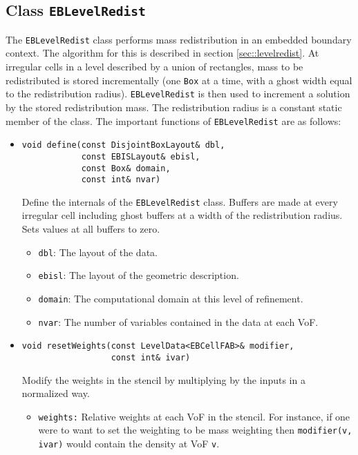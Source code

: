 \subsection{Class {\tt EBLevelRedist}}

The {\tt EBLevelRedist} class performs mass redistribution in an
embedded boundary context.  The algorithm for this is described in
section \ref{sec::levelredist}.  At irregular cells in a level
described by a  union of rectangles, mass to be redistributed is stored 
incrementally (one {\tt Box} at a time, with a ghost width equal
to the redistribution radius).   {\tt EBLevelRedist}  is then used
to increment a solution by the stored redistribution mass.
The redistribution radius is a constant static member of the class.
The important functions of {\tt EBLevelRedist} are as follows:
\begin{itemize}
\item \begin{small}\begin{verbatim}
void define(const DisjointBoxLayout& dbl,
            const EBISLayout& ebisl,
            const Box& domain,
            const int& nvar)
\end{verbatim}\end{small}
Define the internals of the {\tt EBLevelRedist} class.  Buffers
are made at every irregular cell including ghost buffers at a width
of the redistribution radius. Sets values at all buffers to zero.
\begin{itemize}
\item {\tt dbl}: The layout of the data.
\item {\tt ebisl}: The layout of the geometric description.
\item{\tt domain}: The computational domain at this level of refinement.
\item {\tt nvar}: The number of variables contained in the data
        at each VoF.
\end{itemize}

\item \begin{small}\begin{verbatim}
void resetWeights(const LevelData<EBCellFAB>& modifier,
                  const int& ivar)
\end{verbatim}\end{small}
Modify the weights in the stencil by multiplying by
the inputs in a normalized way.
\begin{itemize}
\item {\tt weights:}  Relative weights at each VoF in the
stencil.  For instance, if one were to want to set the 
weighting to be mass weighting then {\tt modifier(v, ivar)}
would contain the density at VoF {\tt v}.
\end{itemize}


\end{itemize}
